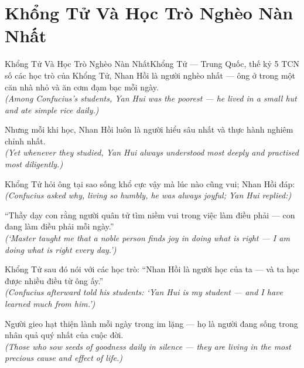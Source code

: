 \section{Khổng Tử Và Học Trò Nghèo Nàn Nhất}
\begin{truyen}{Khổng Tử Và Học Trò Nghèo Nàn Nhất}{Khổng Tử --- Trung Quốc, thế kỷ 5 TCN}
 số các học trò của Khổng Tử, Nhan Hồi là người nghèo nhất --- ông ở trong một căn nhà nhỏ và ăn cơm đạm bạc mỗi ngày.\\[4pt]
\textit{(Among Confucius's students, Yan Hui was the poorest --- he lived in a small hut and ate simple rice daily.)}

Nhưng mỗi khi học, Nhan Hồi luôn là người hiểu sâu nhất và thực hành nghiêm chỉnh nhất.\\[4pt]
\textit{(Yet whenever they studied, Yan Hui always understood most deeply and practised most diligently.)}

Khổng Tử hỏi ông tại sao sống khổ cực vậy mà lúc nào cũng vui; Nhan Hồi đáp:\\[4pt]
\textit{(Confucius asked why, living so humbly, he was always joyful; Yan Hui replied:)}

``Thầy dạy con rằng người quân tử tìm niềm vui trong việc làm điều phải --- con đang làm điều phải mỗi ngày.''\\[4pt]
\textit{(`Master taught me that a noble person finds joy in doing what is right --- I am doing what is right every day.')}

Khổng Tử sau đó nói với các học trò: ``Nhan Hồi là người học của ta --- và ta học được nhiều điều từ ông ấy.''\\[4pt]
\textit{(Confucius afterward told his students: `Yan Hui is my student --- and I have learned much from him.')}

\end{truyen}
\begin{baihoc}
  Người gieo hạt thiện lành mỗi ngày trong im lặng --- họ là người đang sống trong nhân quả quý nhất của cuộc đời.\\[4pt]
  \textit{(Those who sow seeds of goodness daily in silence --- they are living in the most precious cause and effect of life.)}
\end{baihoc}

